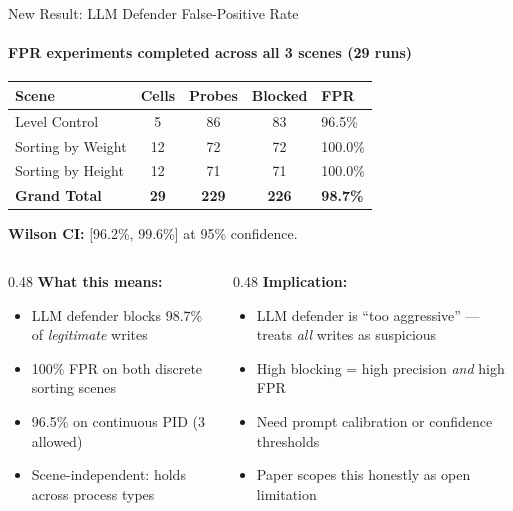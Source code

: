 \documentclass[aspectratio=169,10pt]{beamer}
\begin{document}
\begin{frame}{New Result: LLM Defender False-Positive Rate}
\framesubtitle{FPR experiments completed across all 3 scenes (29 runs)}

\begin{table}
\centering
\small
\begin{tabular}{@{}lcccl@{}}
\toprule
\textbf{Scene} & \textbf{Cells} & \textbf{Probes} & \textbf{Blocked} & \textbf{FPR} \\
\midrule
Level Control & 5 & 86 & 83 & 96.5\% \\
Sorting by Weight & 12 & 72 & 72 & 100.0\% \\
Sorting by Height & 12 & 71 & 71 & 100.0\% \\
\midrule
\textbf{Grand Total} & \textbf{29} & \textbf{229} & \textbf{226} & \textbf{98.7\%} \\
\bottomrule
\end{tabular}
\end{table}

\vspace{0.3em}
\textbf{Wilson CI:} [96.2\%, 99.6\%] at 95\% confidence.

\vspace{0.3em}
\begin{columns}[T]
\begin{column}{0.48\textwidth}
\textbf{What this means:}
\begin{itemize}\small
    \item LLM defender blocks 98.7\% of \emph{legitimate} writes
    \item 100\% FPR on both discrete sorting scenes
    \item 96.5\% on continuous PID (3 allowed)
    \item Scene-independent: holds across process types
\end{itemize}
\end{column}
\begin{column}{0.48\textwidth}
\textbf{Implication:}
\begin{itemize}\small
    \item LLM defender is ``too aggressive'' --- treats \emph{all} writes as suspicious
    \item High blocking = high precision \emph{and} high FPR
    \item Need prompt calibration or confidence thresholds
    \item Paper scopes this honestly as open limitation
\end{itemize}
\end{column}
\end{columns}
\end{frame}
\end{document}
